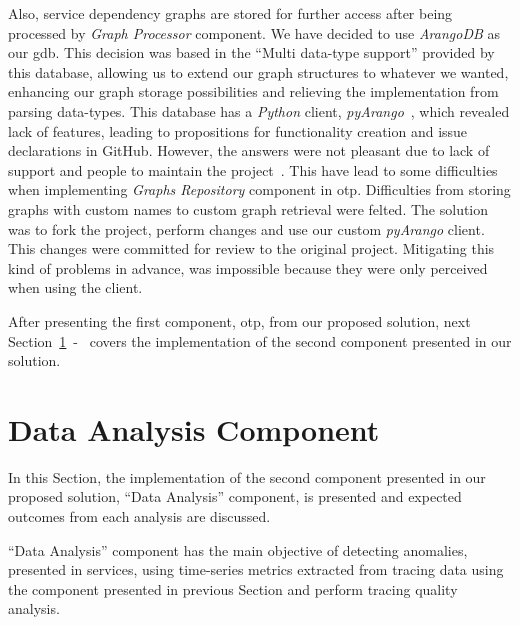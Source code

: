 Also, service dependency graphs are stored for further access after being processed by \emph{Graph Processor} component. We have decided to use \emph{ArangoDB} as our \gls{gdb}. This decision was based in the ``Multi data-type support'' provided by this database, allowing us to extend our graph structures to whatever we wanted, enhancing our graph storage possibilities and relieving the implementation from parsing data-types. This database has a \emph{Python} client, \emph{pyArango}~\cite{pyarango}, which revealed lack of features, leading to propositions for functionality creation and issue declarations in GitHub. However, the answers were not pleasant due to lack of support and people to maintain the project~\cite{arango_issues}. This have lead to some difficulties when implementing \emph{Graphs Repository} component in \gls{otp}. Difficulties from storing graphs with custom names to custom graph retrieval were felted. The solution was to fork the project, perform changes and use our custom \emph{pyArango} client. This changes were committed for review to the original project. Mitigating this kind of problems in advance, was impossible because they were only perceived when using the client.


After presenting the first component, \gls{otp}, from our proposed solution, next Section~\ref{sec:data_analysis_component}~-~ covers the implementation of the second component presented in our solution.

\section{Data Analysis Component}
\label{sec:data_analysis_component}

In this Section, the implementation of the second component presented in our proposed solution, ``Data Analysis'' component, is presented and expected outcomes from each analysis are discussed.

``Data Analysis'' component has the main objective of detecting anomalies, presented in services, using time-series metrics extracted from tracing data using the component presented in previous Section and perform tracing quality analysis.

